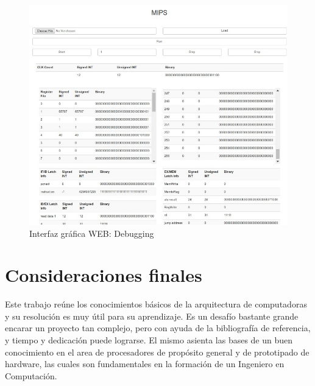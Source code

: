 \documentclass[12pt]{article}
\begin{document}
\begin{figure}[ht]
\centering
\hspace*{-1cm}
\includegraphics[width=1\textwidth]{imagenes/interfaz.jpeg}
\caption{Interfaz gráfica WEB: Debugging}
\label{fig:interfaz}
\end{figure}

\section{Consideraciones finales}

Este trabajo reúne los conocimientos básicos de la arquitectura de computadoras y su resolución es muy útil para su aprendizaje. Es un desafío bastante grande encarar un proyecto tan complejo, pero con ayuda de la bibliografía de referencia, y tiempo y dedicación puede lograrse. El mismo asienta las bases de un buen conocimiento en el area de procesadores de propósito general y de prototipado de hardware, las cuales son fundamentales en la formación de un Ingeniero en Computación.



\end{document}
